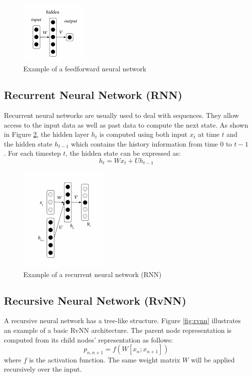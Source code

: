 \documentclass[12pt,a4paper,twoside,openright]{report}
\begin{document}
\begin{figure}[ht]
\centering
\includegraphics[width=0.3\textwidth]{images/fnn.png}
\caption{Example of a feedforward neural network}
\label{fig:fnn}
\end{figure}

\subsection{Recurrent Neural Network (RNN)}
Recurrent neural networks are usually used to deal with sequences. They allow access to the input data as well as past data to compute the next state. As shown in Figure \ref{fig:rnn}, the hidden layer $h_t$ is computed using both input $x_t$ at time $t$ and the hidden state $h_{t-1}$ which contains the history information from time 0 to $t-1$. For each timestep $t$, the hidden state can be expressed as:
\[ h_t = Wx_t + Uh_{t-1} \]

\begin{figure}[ht]
\centering
\includegraphics[width=0.4\textwidth]{images/rnn.png}
\caption{Example of a recurrent neural network (RNN)}
\label{fig:rnn}
\end{figure}


\subsection{Recursive Neural Network (RvNN)}
A recursive neural network has a tree-like structure. Figure \ref{fig:rvnn} illustrates an example of a basic RvNN architecture. The parent node representation is computed from its child nodes' representation as follows:
\[ p_{n, n+1} = f(W[x_n; x_{n+1}]) \]
where $f$ is the activation function. The same weight matrix $W$ will be applied recursively over the input.
\end{document}
